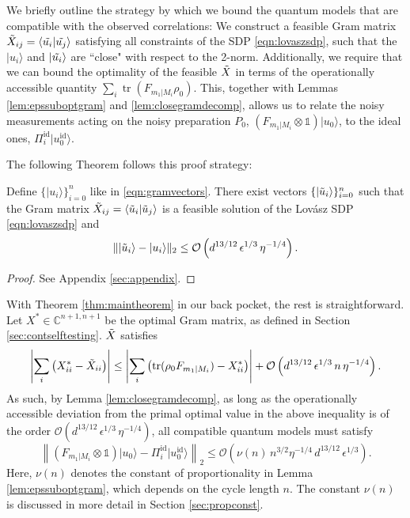 We briefly outline the strategy by which we bound the quantum models that are compatible with the observed correlations: We construct a feasible Gram matrix $\Tilde{X}_{ij}=\langle \Tilde{u_i}\vert \Tilde{u_j}\rangle$ satisfying all constraints of the SDP \ref{eqn:lovaszsdp}, such that the $\vert u_i \rangle$ and $\vert \Tilde{u_i}\rangle$ are ``close" with respect to the 2-norm. Additionally, we require that we can bound the optimality of the feasible $\Tilde{X}$ in terms of the operationally accessible quantity $\sum_i \operatorname{tr}(F_{m_1\vert M_i}\rho_0)$. This, together with Lemmas \ref{lem:epssuboptgram} and \ref{lem:closegramdecomp}, allows us to relate the noisy measurements acting on the noisy preparation $P_0$, $(F_{m_1\vert M_i}\otimes \mathbb{1})\vert u_0 \rangle$, to the ideal ones, $\Pi_i^{\text{id}}\vert u_0^{\text{id}}\rangle$. 

The following Theorem follows this proof strategy:
\begin{theorem}
\label{thm:maintheorem}
Define $\{\vert u_i \rangle \}_{i=0}^n$ like in \ref{eqn:gramvectors}. There exist vectors $\{\vert \Tilde{u}_i \rangle \}_{i=0}^n$ such that the Gram matrix $\Tilde{X}_{ij}=\langle \Tilde{u}_i\vert \Tilde{u}_j \rangle$ is a feasible solution of the Lovász SDP \ref{eqn:lovaszsdp} and
\begin{equation*}
\|\vert \Tilde{u}_i \rangle - \vert u_i \rangle \|_2 \leq \mathcal{O}\left(d^{13/12}\,\epsilon^{1/3}\,\eta^{-1/4}\right).
\end{equation*}
\end{theorem}
\begin{proof}
See Appendix \ref{sec:appendix}.
\end{proof}

With Theorem \ref{thm:maintheorem} in our back pocket, the rest is straightforward.
Let $X^{*}\in\mathbb{C}^{n+1,n+1}$ be the optimal Gram matrix, as defined in Section \ref{sec:contselftesting}. $\Tilde{X}$ satisfies \[\left|\sum_i \left(X^{*}_{ii} - \Tilde{X}_{ii}\right)\right| \leq \left|\sum_i\left(\operatorname{tr}(\rho_0 F_{m_1\vert M_i})-X^*_{ii}\right)\right|+\mathcal{O}\left(d^{13/12}\,\epsilon^{1/3}\,n\,\eta^{-1/4}\right).\]
As such, by Lemma \ref{lem:closegramdecomp}, as long as the operationally accessible deviation from the primal optimal value in the above inequality is of the order $\mathcal{O}\left(d^{13/12}\,\epsilon^{1/3}\,\eta^{-1/4}\right)$, all compatible quantum models must satisfy \[\left\|( F_{m_1\vert M_i}\otimes \mathbb{1})\vert u_0 \rangle - \Pi_i^{\text{id}}\vert u_0^{\text{id}} \rangle \right\|_2\leq \mathcal{O}\left(\nu(n)\, n^{3/2}\eta^{-1/4}\,d^{13/12}\,\epsilon^{1/3}\right).\]
Here, $\nu(n)$ denotes the constant of proportionality in Lemma \ref{lem:epssuboptgram}, which depends on the cycle length $n$. The constant $\nu(n)$ is discussed in more detail in Section \ref{sec:propconst}.

